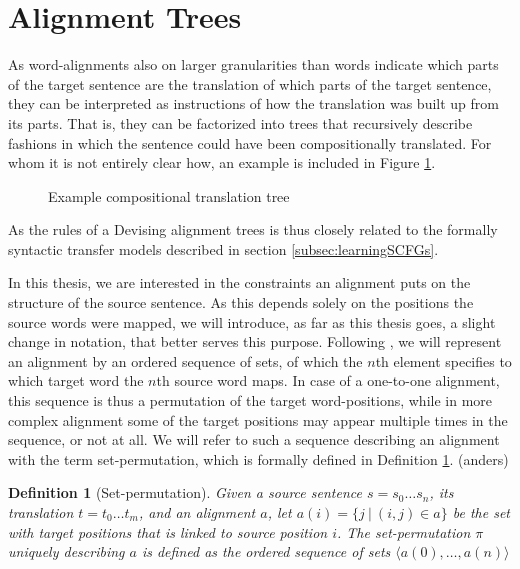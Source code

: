 \documentclass{report}
\theoremstyle{definition}
\theoremstyle{plain}
\newtheorem{definition}{Definition}
\begin{document}
\section{Alignment Trees}
\label{sec:alignmenttrees}

As word-alignments also on larger granularities than words indicate which parts of the target sentence are the translation of which parts of the target sentence, they can be interpreted as instructions of how the translation was built up from its parts. That is, they can be factorized into trees that recursively describe fashions in which the sentence could have been compositionally translated. For whom it is not entirely clear how, an example is included in Figure \ref{fig:atree}.

\begin{figure}
\caption{Example compositional translation tree}\label{fig:atree}
\end{figure}

As the rules of a 
Devising alignment trees is thus closely related to the formally syntactic transfer models described in section \ref{subsec:learningSCFGs}.




In this thesis, we are interested in the constraints an alignment puts on the structure of the source sentence. As this depends solely on the positions the source words were mapped, we will introduce, as far as this thesis goes, a slight change in notation, that better serves this purpose. Following \cite{simaan2013hats}, we will represent an alignment by an ordered sequence of sets, of which the $n$th element specifies to which target word the $n$th source word maps. In case of a one-to-one alignment, this sequence is thus a permutation of the target word-positions, while in more complex alignment some of the target positions may appear multiple times in the sequence, or not at all. We will refer to such a sequence describing an alignment with the term set-permutation, which is formally defined in Definition \ref{def:sperm}. (anders)


\begin{definition}[Set-permutation]\label{def:sperm}
Given a source sentence $s = s_0 \ldots s_n$, its translation $t = t_0 \ldots t_m$, and an alignment $a$, let $a(i) = \{j~|~(i,j)\in a\}$ be the set with target positions that is linked to source position $i$. The set-permutation $\pi$ uniquely describing $a$ is defined as the ordered sequence of sets
$\langle a(0), \ldots, a(n) \rangle$
\end{definition}
\end{document}
